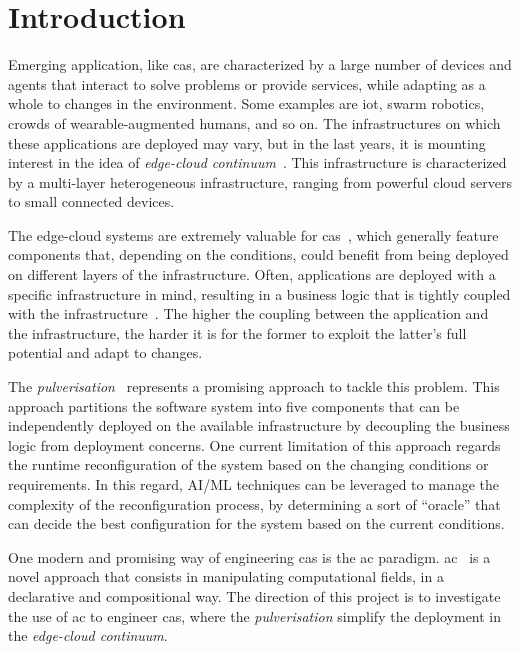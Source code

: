 \documentclass[12pt]{article}
\begin{document}
\section{Introduction}\label{sec:introduction}

Emerging application,
like \ac{cas},
are characterized by a large number of devices and agents
that interact to solve problems or provide services,
while adapting as a whole to changes in the environment.
%
Some examples are \ac{iot}, swarm robotics, crowds of wearable-augmented humans, and so on.
%
The infrastructures on which these applications are deployed may vary,
but in the last years, it is mounting interest in the idea of \emph{edge-cloud continuum}~\cite{DBLP:journals/iot/BittencourtISFM18}.
%
This infrastructure is characterized by a multi-layer heterogeneous infrastructure,
ranging from powerful cloud servers to small connected devices.

The edge-cloud systems are extremely valuable for \ac{cas}~\cite{DBLP:journals/tpds/HongCHGZ19,DBLP:journals/comsur/WangZZMLW20,DBLP:journals/comsur/AfrinJRRWH21,IEEE-IoTJ-pulverization-simulation},
which generally feature components that, depending on the conditions,
could benefit from being deployed on different layers of the infrastructure.
%
Often,
applications are deployed with a specific infrastructure in mind,
resulting in a business logic that is tightly coupled with the infrastructure~\cite{Spolsky2004}.
%
The higher the coupling between the application and the infrastructure,
the harder it is for the former to exploit the latter's full potential and adapt to changes.

The \emph{pulverisation}~\cite{fi12110203} represents a promising approach to tackle this problem.
%
This approach partitions the software system into five components that can be independently deployed on the available infrastructure
by decoupling the business logic from deployment concerns.
%
One current limitation of this approach regards the runtime reconfiguration of the system based on the changing conditions or requirements.
%
In this regard,
AI/ML techniques can be leveraged to manage the complexity of the reconfiguration process,
by determining a sort of ``oracle'' that can decide the best configuration for the system based on the current conditions.

One modern and promising way of engineering \ac{cas} is the \ac{ac} paradigm.
%
\ac{ac}~\cite{best-paper-aggregate} is a novel approach that consists in manipulating computational fields,
in a declarative and compositional way.
%
The direction of this project is to investigate the use of \ac{ac} to engineer \ac{cas},
where the \emph{pulverisation} simplify the deployment in the \emph{edge-cloud continuum}.
\end{document}
